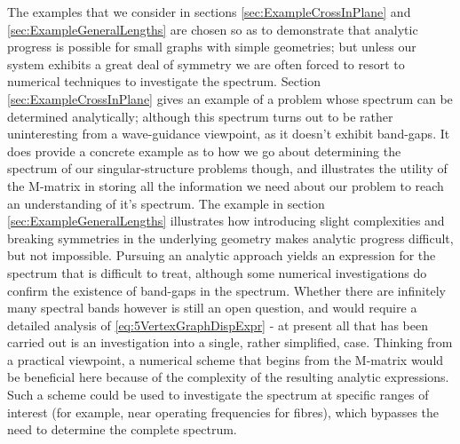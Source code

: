 The examples that we consider in sections \ref{sec:ExampleCrossInPlane} and \ref{sec:ExampleGeneralLengths} are chosen so as to demonstrate that analytic progress is possible for small graphs with simple geometries; but unless our system exhibits a great deal of symmetry we are often forced to resort to numerical techniques to investigate the spectrum.
Section \ref{sec:ExampleCrossInPlane} gives an example of a problem whose spectrum can be determined analytically; although this spectrum turns out to be rather uninteresting from a wave-guidance viewpoint, as it doesn't exhibit band-gaps.
It does provide a concrete example as to how we go about determining the spectrum of our singular-structure problems though, and illustrates the utility of the M-matrix in storing all the information we need about our problem to reach an understanding of it's spectrum.
The example in section \ref{sec:ExampleGeneralLengths} illustrates how introducing slight complexities and breaking symmetries in the underlying geometry makes analytic progress difficult, but not impossible.
Pursuing an analytic approach yields an expression for the spectrum that is difficult to treat, although some numerical investigations do confirm the existence of band-gaps in the spectrum.
Whether there are infinitely many spectral bands however is still an open question, and would require a detailed analysis of \eqref{eq:5VertexGraphDispExpr} - at present all that has been carried out is an investigation into a single, rather simplified, case.
Thinking from a practical viewpoint, a numerical scheme that begins from the M-matrix would be beneficial here because of the complexity of the resulting analytic expressions.
Such a scheme could be used to investigate the spectrum at specific ranges of interest (for example, near operating frequencies for fibres), which bypasses the need to determine the complete spectrum. \newline

